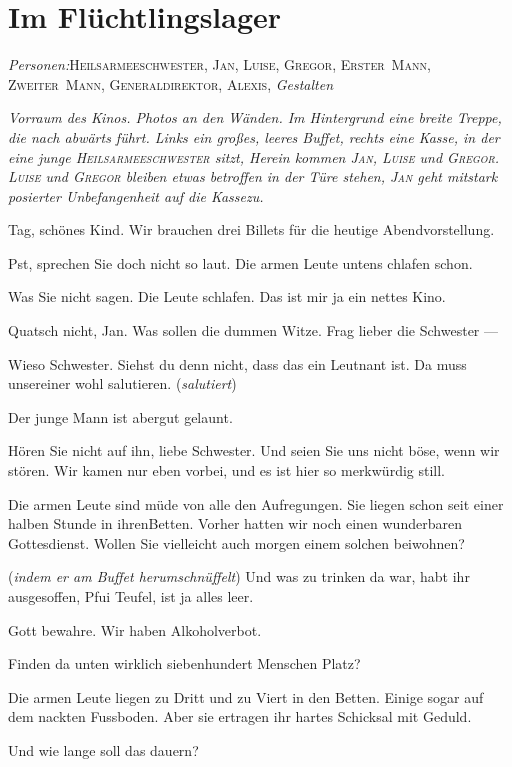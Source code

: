 \documentclass[
	final,
	a4paper,
	ngerman,
	mpinclude = true, %
	twoside = true,
	open = right,
	cleardoublepage = plain,
	DIV = 13,
	BCOR = 1cm,
	titlepage = firstiscover,
	]{scrbook}
\newcommand{\scene}{\setcounter{subscene}{1}\section}
\newcommand{\direction}[1]{(\textit{#1})}
\newcommand{\setting}[1]{\vspace{-0.5\baselineskip}\centering\textit{#1}}
\newcounter{subscene}
\newcommand{\characterlist}[1]{{\begin{center}\textit{Personen:}\quad{}#1\end{center}}}
\newcommand{\thecharacter}[1]{\textup{\textsc{#1}}\xspace}
\newcommand{\theGregor}{\thecharacter{Gregor}}
\newcommand{\theJan}{\thecharacter{Jan}}
\newcommand{\theLuise}{\thecharacter{Luise}}
\newcommand{\theGeneraldirektor}{\thecharacter{Generaldirektor}}
\newcommand{\theAlexis}{\thecharacter{Alexis}}
\newcommand{\theHeilsarmeeschwester}{\thecharacter{Heilsarmeeschwester}}
\newcommand{\theErsterMann}{\thecharacter{Erster~Mann}}
\newcommand{\theZweiterMann}{\thecharacter{Zweiter~Mann}}
\newcommand{\character}[1]{\item[#1]}
\newcommand{\Gregor}{\character{\theGregor}}
\newcommand{\Jan}{\character{\theJan}}
\newcommand{\Luise}{\character{\theLuise}}
\newcommand{\Heilsarmeeschwester}{\character{Schwester}}
\begin{document}
\scene{Im Flüchtlingslager}
\label{scene:III}
\characterlist{\theHeilsarmeeschwester, \theJan, \theLuise, \theGregor, \theErsterMann, \theZweiterMann, \theGeneraldirektor, \theAlexis, \emph{Gestalten}}
\setting{Vorraum des Kinos. Photos an den Wänden. Im Hintergrund eine breite Treppe, die nach abwärts führt. Links ein großes, leeres Buffet, rechts eine Kasse, in der eine junge \theHeilsarmeeschwester sitzt, Herein kommen \theJan, \theLuise und \theGregor. \theLuise und \theGregor bleiben etwas betroffen in der Türe stehen, \theJan geht mitstark posierter Unbefangenheit auf die Kassezu.}
\begin{play}

\Jan
Tag, schönes Kind. Wir brauchen drei Billets für die heutige Abendvorstellung.

\Heilsarmeeschwester
Pst, sprechen Sie doch nicht so laut. Die armen Leute untens chlafen schon.

\Jan
Was Sie nicht sagen. Die Leute schlafen. Das ist mir ja ein nettes Kino.

\Luise
Quatsch nicht, Jan. Was sollen die dummen Witze. Frag lieber die Schwester ---

\Jan
Wieso Schwester. Siehst du denn nicht, dass das ein Leutnant ist. Da muss unsereiner wohl salutieren. \direction{salutiert}

\Heilsarmeeschwester
Der junge Mann ist abergut gelaunt.

\Gregor
Hören Sie nicht auf ihn, liebe Schwester. Und seien Sie uns nicht böse, wenn wir stören. Wir kamen nur eben vorbei, und es ist hier so merkwürdig still.

\Heilsarmeeschwester
Die armen Leute sind müde von alle den Aufregungen. Sie liegen schon seit einer halben Stunde in ihrenBetten. Vorher hatten wir noch einen wunderbaren Gottesdienst. Wollen Sie vielleicht auch morgen einem solchen beiwohnen?

\Jan
\direction{indem er am Buffet herumschnüffelt} Und was zu trinken da war, habt ihr ausgesoffen, Pfui Teufel, ist ja alles leer.

\Heilsarmeeschwester
Gott bewahre. Wir haben Alkoholverbot.

\Luise
Finden da unten wirklich siebenhundert Menschen Platz?

\Heilsarmeeschwester
Die armen Leute liegen zu Dritt und zu Viert in den Betten. Einige sogar auf dem nackten Fussboden. Aber sie ertragen ihr hartes Schicksal mit Geduld.

\Gregor
Und wie lange soll das dauern?


\end{play}
\end{document}
